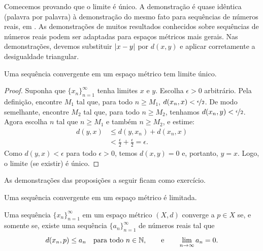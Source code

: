 Comecemos provando que o limite é único. A demonstração é quase idêntica
(palavra por palavra) à demonstração do mesmo fato para sequências de
números reais, em .
As demonstrações de muitos resultados conhecidos sobre sequências de números
reais podem ser adaptadas para espaços métricos mais gerais.
Nas demonstrações, devemos substituir $\lvert {x-y} \rvert$ por $d(x,y)$ e aplicar
corretamente a desigualdade triangular.

\begin{prop} \label{prop:mslimisunique}
Uma sequência convergente em um espaço métrico tem limite único.
\end{prop}

\begin{proof}
Suponha que $\{ x_n \}_{n=1}^\infty$ tenha limites $x$ e $y$.
Escolha $\epsilon > 0$ arbitrário.
Pela definição, encontre $M_1$ tal que, para todo $n \geq M_1$,
$d(x_n,x) < \nicefrac{\epsilon}{2}$. De modo semelhante, encontre $M_2$
tal que, para todo $n \geq M_2$, tenhamos
$d(x_n,y) < \nicefrac{\epsilon}{2}$. Agora escolha $n$ tal que
$n \geq M_1$ e também $n \geq M_2$, e estime:
\begin{equation*}
\begin{split}
d(y,x)
& \leq
d(y,x_n) + d(x_n,x) \\
& <
\frac{\epsilon}{2} + \frac{\epsilon}{2} = \epsilon .
\end{split}
\end{equation*}
Como $d(y,x) < \epsilon$ para todo $\epsilon > 0$, temos $d(x,y) = 0$
e, portanto, $y=x$. Logo, o limite (se existir) é único.
\end{proof}

As demonstrações das proposições a seguir ficam como exercício.

\begin{prop} \label{prop:msconvbound}
Uma sequência convergente em um espaço métrico é limitada.
\end{prop}

\begin{prop} \label{prop:msconvifa}
Uma sequência $\{ x_n \}_{n=1}^\infty$ em um espaço métrico $(X,d)$ converge
a $p \in X$ se, e somente se, existe uma sequência $\{ a_n \}_{n=1}^\infty$
de números reais tal que
\begin{equation*}
d(x_n,p) \leq a_n \quad \text{para todo } n \in {\mathbb{N}},
\qquad
\text{e}
\qquad
\lim_{n\to\infty} a_n = 0.
\end{equation*}
\end{prop}

